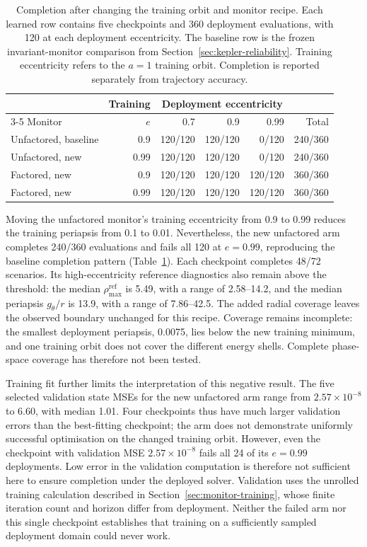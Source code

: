 \documentclass[final,3p,times]{elsarticle}
\begin{document}
\begin{table}[t]
\centering
\caption{Completion after changing the training orbit and monitor recipe.
Each learned row contains five checkpoints and 360 deployment evaluations,
with 120 at each deployment eccentricity. The baseline row is the frozen
invariant-monitor comparison from Section~\ref{sec:kepler-reliability}.
Training eccentricity refers to the $a=1$ training orbit. Completion is
reported separately from trajectory accuracy.}
\label{tab:training-factorisation}
\begingroup
\renewcommand{\baselinestretch}{1}\small
\setlength{\tabcolsep}{4pt}
\begin{tabular}{lrrrrr}
\toprule
 & Training & \multicolumn{3}{c}{Deployment eccentricity} & \\
\cmidrule(lr){3-5}
Monitor & $e$ & 0.7 & 0.9 & 0.99 & Total \\
\midrule
Unfactored, baseline & 0.9 & 120/120 & 120/120 & 0/120 & 240/360 \\
Unfactored, new & 0.99 & 120/120 & 120/120 & 0/120 & 240/360 \\
Factored, new & 0.9 & 120/120 & 120/120 & 120/120 & 360/360 \\
Factored, new & 0.99 & 120/120 & 120/120 & 120/120 & 360/360 \\
\bottomrule
\end{tabular}
\endgroup
\end{table}

Moving the unfactored monitor's training eccentricity from 0.9 to 0.99
reduces the training periapsis from 0.1 to 0.01. Nevertheless, the new
unfactored arm completes 240/360 evaluations and fails all 120 at
$e=0.99$, reproducing the baseline completion pattern
(Table~\ref{tab:training-factorisation}). Each checkpoint completes
48/72 scenarios. Its high-eccentricity reference diagnostics also remain
above the threshold: the median $\rho_{\max}^{\mathrm{ref}}$ is 5.49,
with a range of 2.58--14.2, and the median periapsis $g_\theta/r$ is 13.9,
with a range of 7.86--42.5. The added radial coverage leaves the observed boundary
unchanged for this recipe. Coverage remains incomplete: the smallest
deployment periapsis, 0.0075, lies below the new training minimum, and
one training orbit does not cover the different energy shells. Complete
phase-space coverage has therefore not been tested.

Training fit further limits the interpretation of this negative result.
The five selected validation state MSEs for the new unfactored arm range
from $2.57\times10^{-8}$ to 6.60, with median 1.01. Four checkpoints thus
have much larger validation errors than the best-fitting checkpoint;
the arm does not demonstrate uniformly successful optimisation on the
changed training orbit. However, even the checkpoint with validation MSE
$2.57\times10^{-8}$ fails all 24 of its $e=0.99$ deployments. Low error
in the validation computation is therefore not sufficient here to ensure
completion under the deployed solver. Validation uses the unrolled
training calculation described in Section~\ref{sec:monitor-training},
whose finite iteration count and horizon differ from deployment.
Neither the failed arm nor this single checkpoint establishes that
training on a sufficiently sampled deployment domain could never work.
\end{document}
